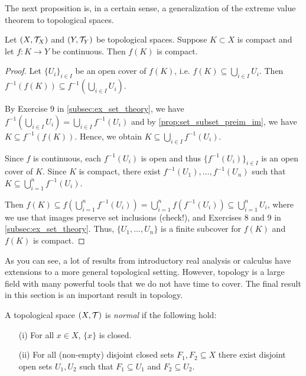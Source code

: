 \documentclass{article}
\begin{document}
The next proposition is, in a certain sense, a generalization of the extreme value theorem to topological spaces.

\begin{proposition}
Let $(X,\mathcal{T}_X)$ and $(Y, \mathcal{T}_Y)$ be topological spaces. Suppose $K\subset X$ is compact and let $f\colon K \to Y$ be continuous. Then $f(K)$ is compact. 
\end{proposition}

\begin{proof}
Let $\{U_i\}_{i\in I}$ be an open cover of $f(K)$, i.e. $f(K) \subseteq \bigcup_{i\in I} U_i$. Then $f^{-1}(f(K)) \subseteq f^{-1}(\bigcup_{i\in I} U_i)$. 

By Exercise 9 in \cref{subsec:ex_set_theory}, we have $f^{-1}(\bigcup_{i\in I} U_i) = \bigcup_{i\in I}f^{-1} (U_i)$ and by \cref{prop:set_subset_preim_im}, we have $K\subseteq f^{-1}(f(K))$. Hence, we obtain $K \subseteq \bigcup_{i\in I}f^{-1} (U_i)$. 

Since $f$ is continuous, each $f^{-1} (U_i)$ is open and thus $\{f^{-1} (U_i)\}_{i\in I}$ is an open cover of $K$. Since $K$ is compact, there exist $f^{-1}(U_1),\ldots, f^{-1}(U_n)$ such that $K \subseteq \bigcup_{i=1}^n f^{-1}(U_i)$. 

Then $f(K) \subseteq f(\bigcup_{i=1}^n f^{-1}(U_i)) = \bigcup_{i=1}^n f(f^{-1}(U_i)) \subseteq \bigcup_{i=1}^n U_i$, where we use that images preserve set inclusions (check!), and Exercises 8 and 9 in \cref{subsec:ex_set_theory}. Thus, $\{U_1,\ldots, U_n\}$ is a finite subcover for $f(K)$ and $f(K)$ is compact. 
\end{proof}

As you can see, a lot of results from introductory real analysis or calculus have extensions to a more general topological setting. However, topology is a large field with many powerful tools that we do not have time to cover. The final result in this section is an important result in topology. 

\begin{definition}
A topological space $(X,\mathcal{T})$ is \emph{normal} if the following hold:
\begin{itemize}
    \item[(i)] For all $x\in X$, $\{x\}$ is closed.
    \item[(ii)] For all (non-empty) disjoint closed sets $F_1,F_2\subseteq X$ there exist disjoint open sets $U_1, U_2$ such that $F_1\subseteq U_1$ and $F_2\subseteq U_2$.
\end{itemize}
\end{definition}
\end{document}
